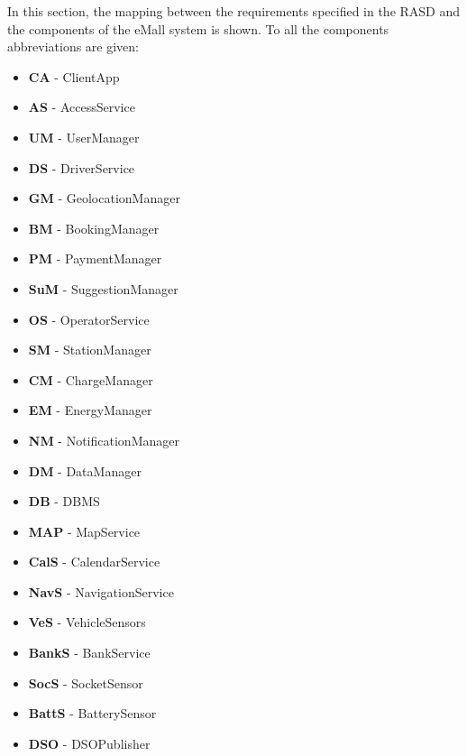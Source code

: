 \documentclass[../main.tex]{subfiles}
\begin{document}
In this section, the mapping between the requirements specified in the RASD and the components of the eMall system is shown. To all the components abbreviations are given:
\begin{itemize}
    \item \textbf{CA} - ClientApp
    \item \textbf{AS} - AccessService
    \item \textbf{UM} - UserManager
    \item \textbf{DS} - DriverService
    \item \textbf{GM} - GeolocationManager
    \item \textbf{BM} - BookingManager
    \item \textbf{PM} - PaymentManager
    \item \textbf{SuM} - SuggestionManager
    \item \textbf{OS} - OperatorService
    \item \textbf{SM} - StationManager
    \item \textbf{CM} - ChargeManager
    \item \textbf{EM} - EnergyManager
    \item \textbf{NM} - NotificationManager
    \item \textbf{DM} - DataManager
    \item \textbf{DB} - DBMS
    \item \textbf{MAP} - MapService
    \item \textbf{CalS} - CalendarService
    \item \textbf{NavS} - NavigationService
    \item \textbf{VeS} - VehicleSensors
    \item \textbf{BankS} - BankService
    \item \textbf{SocS} - SocketSensor
    \item \textbf{BattS} - BatterySensor
    \item \textbf{DSO} - DSOPublisher
\end{itemize}
\end{document}
